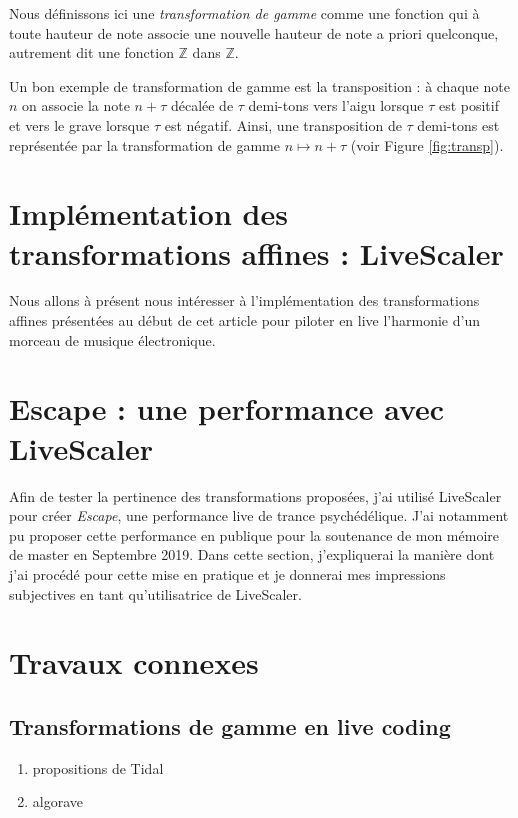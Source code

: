 \documentclass[french,11pt]{article}
\begin{document}
Nous définissons ici une \emph{transformation de gamme} comme une fonction qui à toute hauteur de note associe une nouvelle hauteur de note a priori quelconque, autrement dit une fonction $\mathbb{Z}$ dans $\mathbb{Z}$.

Un bon exemple de transformation de gamme est la transposition : à chaque note $n$ on associe la note $n+\tau$  décalée de $\tau$ demi-tons vers l'aigu lorsque $\tau$ est positif et vers le grave lorsque $\tau$ est négatif. Ainsi, une transposition de $\tau$ demi-tons est représentée par la transformation de gamme $ n \mapsto n+\tau$ (voir Figure \ref{fig:transp}).










\section{Implémentation des transformations affines : LiveScaler}
Nous allons à présent nous intéresser à l'implémentation des transformations affines présentées au début de cet article pour piloter en live l'harmonie d'un morceau de musique électronique. 









\section{Escape : une performance avec LiveScaler }
Afin de tester la pertinence des transformations proposées, j'ai utilisé LiveScaler pour créer \emph{Escape}, une performance live de trance psychédélique. J'ai notamment pu proposer cette performance en publique pour la soutenance de mon mémoire de master en Septembre 2019. Dans cette section, j'expliquerai la manière dont j'ai procédé pour cette mise en pratique et je donnerai mes impressions subjectives en tant qu'utilisatrice de LiveScaler.





\section{Travaux connexes}




\subsection{Transformations de gamme en live coding}
\begin{enumerate}
  \item propositions de Tidal
  \item algorave
\end{enumerate}
\end{document}
